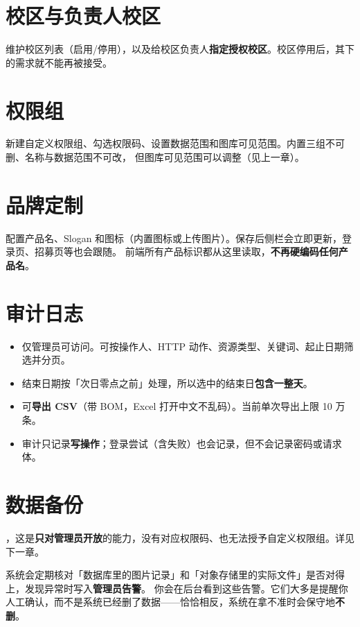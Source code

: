 \documentclass[cn,11pt,green]{elegantbook}
\begin{document}
\section{校区与负责人校区}

维护校区列表（启用/停用），以及给校区负责人\textbf{指定授权校区}。校区停用后，其下的需求就不能再被接受。

\section{权限组}

新建自定义权限组、勾选权限码、设置数据范围和图库可见范围。内置三组不可删、名称与数据范围不可改，
但图库可见范围可以调整（见上一章）。

\section{品牌定制}

配置产品名、Slogan 和图标（内置图标或上传图片）。保存后侧栏会立即更新，登录页、招募页等也会跟随。
前端所有产品标识都从这里读取，\textbf{不再硬编码任何产品名}。

\section{审计日志}

\begin{itemize}
  \item 仅管理员可访问。可按操作人、HTTP 动作、资源类型、关键词、起止日期筛选并分页。
  \item 结束日期按「次日零点之前」处理，所以选中的结束日\textbf{包含一整天}。
  \item 可\textbf{导出 CSV}（带 BOM，Excel 打开中文不乱码）。当前单次导出上限 10 万条。
  \item 审计只记录\textbf{写操作}；登录尝试（含失败）也会记录，但不会记录密码或请求体。
\end{itemize}

\section{数据备份}

，这是\textbf{只对管理员开放}的能力，没有对应权限码、也无法授予自定义权限组。详见下一章。

\begin{notebox}[存储对账与告警]
  系统会定期核对「数据库里的图片记录」和「对象存储里的实际文件」是否对得上，发现异常时写入\textbf{管理员告警}。
  你会在后台看到这些告警。它们大多是提醒你人工确认，而不是系统已经删了数据——恰恰相反，系统在拿不准时会保守地\textbf{不删}。
\end{notebox}
\end{document}
